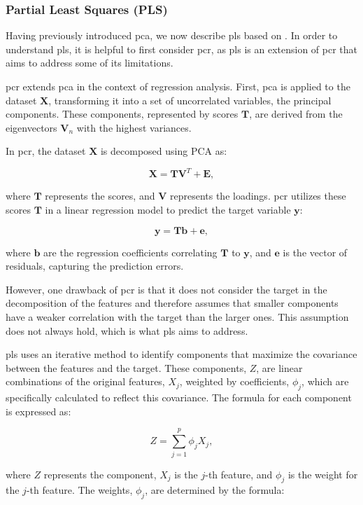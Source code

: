 \subsubsection{Partial Least Squares (PLS)}
Having previously introduced \gls{pca}, we now describe \gls{pls} based on \citet{James2023AnIS}.
In order to understand \gls{pls}, it is helpful to first consider \gls{pcr}, as \gls{pls} is an extension of \gls{pcr} that aims to address some of its limitations.

\gls{pcr} extends \gls{pca} in the context of regression analysis.
First, \gls{pca} is applied to the dataset $\mathbf{X}$, transforming it into a set of uncorrelated variables, the principal components.
These components, represented by scores $\mathbf{T}$, are derived from the eigenvectors $\mathbf{V}_n$ with the highest variances.

In \gls{pcr}, the dataset $\mathbf{X}$ is decomposed using PCA as:

$$
\mathbf{X} = \mathbf{TV}^T + \mathbf{E},
$$

where $\mathbf{T}$ represents the scores, and $\mathbf{V}$ represents the loadings.
\gls{pcr} utilizes these scores $\mathbf{T}$ in a linear regression model to predict the target variable $\mathbf{y}$:

$$
\mathbf{y} = \mathbf{Tb} + \mathbf{e},
$$

where $\mathbf{b}$ are the regression coefficients correlating $\mathbf{T}$ to $\mathbf{y}$, and $\mathbf{e}$ is the vector of residuals, capturing the prediction errors.

However, one drawback of \gls{pcr} is that it does not consider the target in the decomposition of the features and therefore assumes that smaller components have a weaker correlation with the target than the larger ones.
This assumption does not always hold, which is what \gls{pls} aims to address.

\gls{pls} uses an iterative method to identify components that maximize the covariance between the features and the target.
These components, $Z$, are linear combinations of the original features, $X_j$, weighted by coefficients, $\phi_j$, which are specifically calculated to reflect this covariance.
The formula for each component is expressed as:

$$
    Z = \sum_{j=1}^{p} \phi_j X_j,
$$

where $Z$ represents the component, $X_j$ is the $j$-th feature, and $\phi_j$ is the weight for the $j$-th feature.
The weights, $\phi_j$, are determined by the formula:


